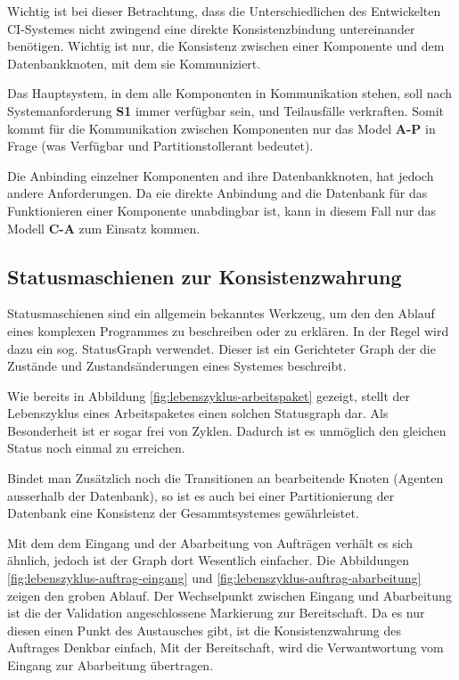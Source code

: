 Wichtig ist bei dieser Betrachtung, dass die Unterschiedlichen des Entwickelten CI-Systemes
nicht zwingend eine direkte Konsistenzbindung untereinander ben\"otigen.
Wichtig ist nur, die Konsistenz zwischen einer Komponente und dem Datenbankknoten,
mit dem sie Kommuniziert.

Das Hauptsystem, in dem alle Komponenten in Kommunikation stehen,
soll nach Systemanforderung \textbf{S1} immer verf\"ugbar sein, und Teilausf\"alle verkraften.
Somit kommt f\"ur die Kommunikation zwischen Komponenten nur das Model \textbf{A-P} in Frage
(was Verf\"ugbar und Partitionstollerant bedeutet).

Die Anbinding einzelner Komponenten and ihre Datenbankknoten, hat jedoch andere Anforderungen.
Da eie direkte Anbindung and die Datenbank f\"ur das Funktionieren einer Komponente unabdingbar ist,
kann in diesem Fall nur das Modell \textbf{C-A} zum Einsatz kommen.




\subsection{Statusmaschienen zur Konsistenzwahrung}

\nocite{statechart}

Statusmaschienen sind ein allgemein bekanntes Werkzeug,
um den den Ablauf eines komplexen Programmes zu beschreiben oder zu erkl\"aren.
In der Regel wird dazu ein sog. StatusGraph verwendet.
Dieser ist ein Gerichteter Graph der die Zust\"ande und Zustands\"anderungen eines Systemes beschreibt.

Wie bereits in Abbildung \ref{fig:lebenszyklus-arbeitspaket} gezeigt,
stellt der Lebenszyklus eines Arbeitspaketes einen solchen Statusgraph dar.
Als Besonderheit ist er sogar frei von Zyklen.
Dadurch ist es unm\"oglich den gleichen Status noch einmal zu erreichen.

Bindet man Zus\"atzlich noch die Transitionen an bearbeitende Knoten (Agenten ausserhalb der Datenbank),
so ist es auch bei einer Partitionierung der Datenbank eine Konsistenz der Gesammtsystemes gew\"ahrleistet.



Mit dem dem Eingang und der Abarbeitung von Auftr\"agen verh\"alt es sich \"ahnlich,
jedoch ist der Graph dort Wesentlich einfacher.
Die Abbildungen \ref{fig:lebenszyklus-auftrag-eingang} und \ref{fig:lebenszyklus-auftrag-abarbeitung} zeigen den groben Ablauf.
Der Wechselpunkt zwischen Eingang und Abarbeitung ist die der Validation angeschlossene Markierung zur Bereitschaft.
Da es nur diesen einen Punkt des Austausches gibt, ist die Konsistenzwahrung des Auftrages Denkbar einfach,
Mit der Bereitschaft, wird die Verwantwortung vom Eingang zur Abarbeitung \"ubertragen.

